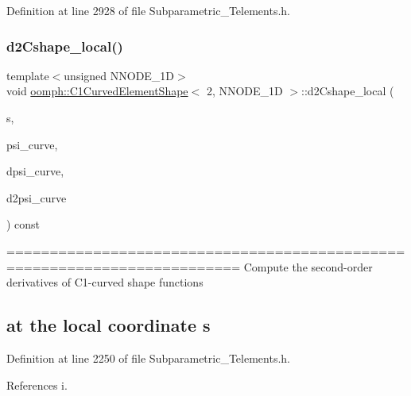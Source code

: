 Definition at line 2928 of file Subparametric\+\_\+\+Telements.\+h.

\mbox{\label{classoomph_1_1C1CurvedElementShape_3_012_00_01NNODE__1D_01_4_ae39e21f6c15e0544355c7b1119631409}} 
\subsubsection{\texorpdfstring{d2\+Cshape\+\_\+local()}{d2Cshape\_local()}}
{\footnotesize\ttfamily template$<$unsigned N\+N\+O\+D\+E\+\_\+1D$>$ \\
void \hyperlink{classoomph_1_1C1CurvedElementShape}{oomph\+::\+C1\+Curved\+Element\+Shape}$<$ 2, N\+N\+O\+D\+E\+\_\+1D $>$\+::d2\+Cshape\+\_\+local (\begin{DoxyParamCaption}\item[{const \hyperlink{classoomph_1_1Vector}{Vector}$<$ double $>$ \&}]{s,  }\item[{\hyperlink{classoomph_1_1Shape}{Shape} \&}]{psi\+\_\+curve,  }\item[{\hyperlink{classoomph_1_1DShape}{D\+Shape} \&}]{dpsi\+\_\+curve,  }\item[{\hyperlink{classoomph_1_1DShape}{D\+Shape} \&}]{d2psi\+\_\+curve }\end{DoxyParamCaption}) const\hspace{0.3cm}{\ttfamily [inline]}}

========================================================================= Compute the second-\/order derivatives of C1-\/curved shape functions \subsection*{at the local coordinate s }

Definition at line 2250 of file Subparametric\+\_\+\+Telements.\+h.



References i.

\mbox{\label{classoomph_1_1C1CurvedElementShape_3_012_00_01NNODE__1D_01_4_ab40b2d47f321db5868443846290c2744}} 
